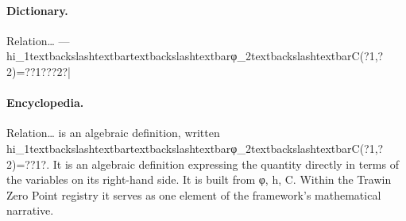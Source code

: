\paragraph{Dictionary.}
Relation… — hi\_1textbackslashtextbartextbackslashtextbarφ\_2textbackslashtextbarC(?1,?2)=??1???2?|

\paragraph{Encyclopedia.}
Relation… is an algebraic definition, written hi\_1textbackslashtextbartextbackslashtextbarφ\_2textbackslashtextbarC(?1,?2)=??1?. It is an algebraic definition expressing the quantity directly in terms of the variables on its right-hand side. It is built from φ, h, C. Within the Trawin Zero Point registry it serves as one element of the framework's mathematical narrative.

